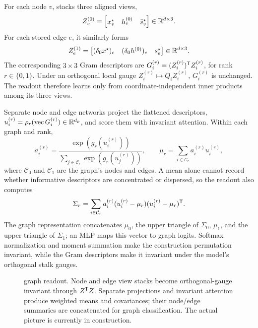 For each node \(v\), \sheafconvpool{} stacks three aligned views,
\begin{equation}
  Z_v^{(0)}
  =\begin{bmatrix}x_v^\star&h_v^{(0)}&\bar s_v^\star\end{bmatrix}
  \in\mathbb{R}^{d\times3}.
\end{equation}
For each stored edge \(e\), it similarly forms
\begin{equation}
  Z_e^{(1)}
  =\begin{bmatrix}
    (\delta_0x^\star)_e&(\delta_0h^{(0)})_e&s_e^\star
  \end{bmatrix}
  \in\mathbb{R}^{d\times3}.
\end{equation}
The corresponding \(3\times3\) Gram descriptors are
\(G_i^{(r)}=(Z_i^{(r)})^{\mathsf{T}}Z_i^{(r)}\), for rank \(r\in\{0,1\}\).
Under an orthogonal local gauge \(Z_i^{(r)}\mapsto Q_iZ_i^{(r)}\),
\(G_i^{(r)}\) is unchanged.  The readout therefore learns only from coordinate-independent
inner products among its three views.

Separate node and edge networks project the flattened descriptors,
\(u_i^{(r)}=\rho_r(\operatorname{vec}G_i^{(r)})\in\mathbb{R}^{d_p}\), and score them with invariant
attention.  Within each graph and rank,
\begin{equation}
  a_i^{(r)}
  =\frac{\exp(g_r(u_i^{(r)}))}
         {\sum_{j\in\mathcal{C}_r}\exp(g_r(u_j^{(r)}))},
  \qquad
  \mu_r=\sum_{i\in\mathcal{C}_r}a_i^{(r)}u_i^{(r)},
\end{equation}
where \(\mathcal{C}_0\) and \(\mathcal{C}_1\) are the graph's nodes and edges.  A mean alone cannot
record whether informative descriptors are concentrated or dispersed, so the readout also computes
\begin{equation}
  \Sigma_r
  =\sum_{i\in\mathcal{C}_r}a_i^{(r)}
    (u_i^{(r)}-\mu_r)(u_i^{(r)}-\mu_r)^{\mathsf{T}}.
\end{equation}
The graph representation concatenates
\(\mu_0\), the upper triangle of \(\Sigma_0\), \(\mu_1\), and the upper triangle of
\(\Sigma_1\); an MLP maps this vector to graph logits.  Softmax normalization and moment summation
make the construction permutation invariant, while the Gram descriptors make it invariant under
the model's orthogonal stalk gauges.

\begin{figure}[t]
  \centering
  \fbox{\rule{0pt}{4.2cm}\rule{0.94\columnwidth}{0pt}}
  \caption{\sheafconvpool{} graph readout.  Node and edge view stacks become orthogonal-gauge
  invariant through \(Z^{\mathsf{T}}Z\).  Separate projections and invariant attention produce
  weighted means and covariances; their node/edge summaries are concatenated for graph
  classification. The actual picture is currently in construction.}
  \label{fig:sheafconvpool}
\end{figure}


